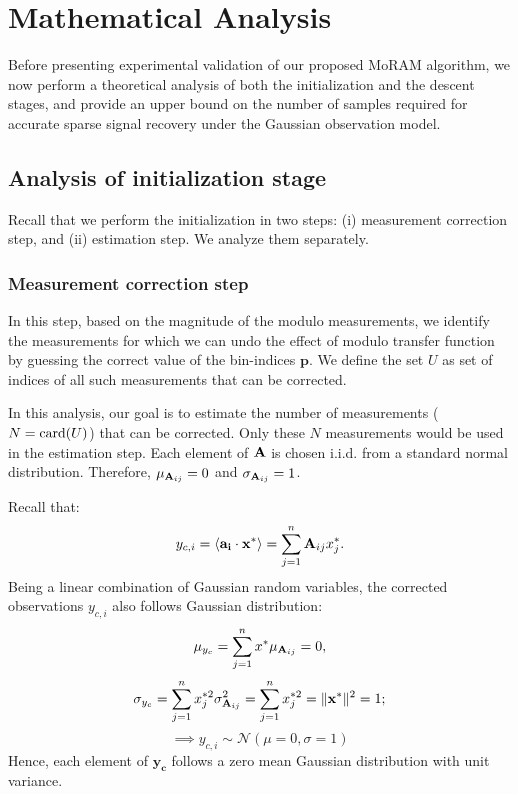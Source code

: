 \section{Mathematical Analysis}
\label{sec:mathanalysis}

Before presenting experimental validation of our proposed MoRAM algorithm, we now perform a theoretical analysis of both the initialization and the descent stages, and provide an upper bound on the number of samples required for accurate sparse signal recovery under the Gaussian observation model.

\subsection{Analysis of initialization stage}
Recall that we perform the initialization in two steps:
(i) measurement correction step, and (ii) estimation step. We analyze them separately.

\subsubsection{Measurement correction step}\label{meascorr} In this step, based on the magnitude of the modulo measurements, we identify the measurements for which we can undo the effect of modulo transfer function by guessing the correct value of the bin-indices $\mathbf{p}$. We define the set $U$ as set of indices of all such measurements that can be corrected. %

In this analysis, our goal is to estimate the number of measurements ($N=\mathrm{card}(U)$) that can be corrected. Only these $N$ measurements would be used in the estimation step. Each element of $\mathbf{A}$ is chosen i.i.d. from a standard normal distribution. Therefore, $\mu_{\mathbf{A}_{ij}} = 0$ and $\sigma_{\mathbf{A}_{ij}}=1$. 

Recall that:
$$
y_{c,i} =\langle \mathbf{a_i} \cdot \mathbf{x^*} \rangle = \sum_{j=1}^{n}\mathbf{A}_{ij}x^*_{j}.
$$
Being a linear combination of Gaussian random variables, the corrected observations $y_{c,i}$ also follows Gaussian distribution:
$$
\mu_{y_{c}} = \sum_{j=1}^{n}x^{*}\mu_{\mathbf{A}_{ij}} = 0,
$$
$$
\sigma_{y_{c}} =\sum_{j=1}^{n}x^{*2}_{j} \sigma^2_{\mathbf{A}_{ij}} = \sum_{j=1}^{n}x^{*2}_{j} = \|\mathbf{{x}^*}\|^2 = 1;
$$
$$
\implies y_{c,i} \sim \mathcal{N}\left(\mu= 0, \sigma = 1 \right)
$$
Hence, each element of $\mathbf{y_c}$ follows a zero mean Gaussian distribution with unit variance.

